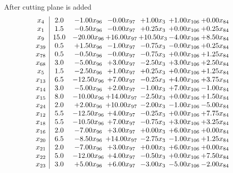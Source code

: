 \documentclass[8pt]{article}
\begin{document}
 After cutting plane is added 
\[\begin{array}{c| c c@{\hskip 2pt} c@{\hskip 2pt} c@{\hskip 2pt} c@{\hskip 2pt} c@{\hskip 2pt} }
 x_{4}   &  2.0 & -1.00 x_{96} & -0.00 x_{97} & +  1.00 x_{3} & +  1.00 x_{106} & +  0.00 x_{84}\\
 x_{1}   &  1.5 & -0.50 x_{96} & -0.00 x_{97} & +  0.25 x_{3} & +  0.00 x_{106} & +  0.25 x_{84}\\
 x_{9}   &  15.0 & -20.00 x_{96} & + 16.00 x_{97} & + 10.50 x_{3} & -4.00 x_{106} & +  8.50 x_{84}\\
 x_{39}   &  0.5 & +  1.50 x_{96} & -1.00 x_{97} & -0.75 x_{3} & -0.00 x_{106} & +  0.25 x_{84}\\
 x_{78}   &  0.5 & -0.50 x_{96} & -0.00 x_{97} & -0.75 x_{3} & +  0.00 x_{106} & +  1.25 x_{84}\\
 x_{68}   &  3.0 & -5.00 x_{96} & +  3.00 x_{97} & -2.50 x_{3} & +  3.00 x_{106} & +  2.50 x_{84}\\
 x_{5}   &  1.5 & -2.50 x_{96} & +  1.00 x_{97} & +  0.25 x_{3} & +  0.00 x_{106} & +  1.25 x_{84}\\
 x_{13}   &  6.5 & -12.50 x_{96} & +  7.00 x_{97} & -0.25 x_{3} & +  4.00 x_{106} & +  3.75 x_{84}\\
 x_{14}   &  3.0 & -5.00 x_{96} & +  2.00 x_{97} & -1.00 x_{3} & +  7.00 x_{106} & -1.00 x_{84}\\
 x_{15}   &  8.0 & -10.00 x_{96} & + 14.00 x_{97} & -2.50 x_{3} & +  0.00 x_{106} & +  1.50 x_{84}\\
 x_{24}   &  2.0 & +  2.00 x_{96} & + 10.00 x_{97} & -2.00 x_{3} & -1.00 x_{106} & -5.00 x_{84}\\
 x_{12}   &  5.5 & -12.50 x_{96} & +  4.00 x_{97} & -0.25 x_{3} & +  0.00 x_{106} & +  7.75 x_{84}\\
 x_{18}   &  5.5 & -10.50 x_{96} & +  7.00 x_{97} & -0.75 x_{3} & +  3.00 x_{106} & +  3.25 x_{84}\\
 x_{16}   &  2.0 & -7.00 x_{96} & +  3.00 x_{97} & +  0.00 x_{3} & +  6.00 x_{106} & +  0.00 x_{84}\\
 x_{20}   &  6.5 & -8.50 x_{96} & + 14.00 x_{97} & -2.75 x_{3} & -1.00 x_{106} & +  1.25 x_{84}\\
 x_{21}   &  2.0 & -7.00 x_{96} & +  3.00 x_{97} & +  0.00 x_{3} & +  6.00 x_{106} & +  0.00 x_{84}\\
 x_{22}   &  5.0 & -12.00 x_{96} & +  4.00 x_{97} & -0.50 x_{3} & +  0.00 x_{106} & +  7.50 x_{84}\\
 x_{23}   &  3.0 & +  5.00 x_{96} & +  6.00 x_{97} & -3.00 x_{3} & -5.00 x_{106} & -2.00 x_{84}\\

\end{array}\]
\end{document}
